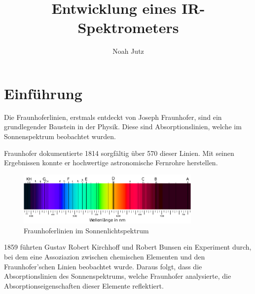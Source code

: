 \documentclass{article}
\title{Entwicklung eines IR-Spektrometers}
\author{Noah Jutz}
\date{}
\begin{document}
\maketitle
\tableofcontents

\newpage
\section{Einführung}



Die Fraunhoferlinien, erstmals entdeckt von Joseph Fraunhofer, sind ein grundlegender Baustein in der Physik. Diese sind Absorptionslinien, welche im Sonnenspektrum beobachtet wurden.

Fraunhofer dokumentierte 1814 sorgfältig über 570 dieser Linien. Mit seinen Ergebnissen konnte er hochwertige astronomische Fernrohre herstellen.

\begin{figure}[H]
    \centering
    \includegraphics[width=0.8\textwidth]{2000px-Fraunhofer_lines_DE.svg.png}
    \caption{Fraunhoferlinien im Sonnenlichtspektrum}
\end{figure}

1859 führten Gustav Robert Kirchhoff und Robert Bunsen ein Experiment durch, bei dem eine Assoziazion zwischen chemischen Elementen und den Fraunhofer'schen Linien beobachtet wurde. Daraus folgt, dass die Absorptionslinien des Sonnenspektrums, welche Fraunhofer analysierte, die Absorptionseigenschaften dieser Elemente reflektiert.
\end{document}
